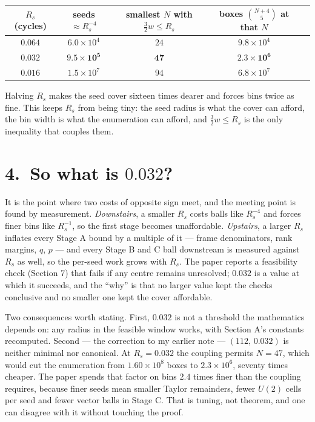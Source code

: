 \documentclass[11pt]{article}
\begin{document}
\begin{center}
\begin{tabular}{@{}ccccc@{}}
\toprule
$R_s$ (cycles) & seeds $\approx R_s^{-4}$ & smallest $N$ with $\tfrac32w\le R_s$ & boxes $\binom{N+4}{5}$ at that $N$\\
\midrule
$0.064$ & $6.0\times10^{4}$ & $24$ & $9.8\times10^{4}$\\
$\mathbf{0.032}$ & $\mathbf{9.5\times10^{5}}$ & $\mathbf{47}$ & $\mathbf{2.3\times10^{6}}$\\
$0.016$ & $1.5\times10^{7}$ & $94$ & $6.8\times10^{7}$\\
\bottomrule
\end{tabular}
\end{center}

\noindent
Halving $R_s$ makes the seed cover sixteen times dearer and forces bins twice as fine. This keeps $R_s$
from being tiny: the seed radius is what the cover can afford, the bin width is what the enumeration
can afford, and $\tfrac32w\le R_s$ is the only inequality that couples them.

\section*{4.\ So what is $0.032$?}

It is the point where two costs of opposite sign meet, and the meeting point is found by measurement.
\emph{Downstairs}, a smaller $R_s$ costs balls like $R_s^{-4}$ and forces finer bins like $R_s^{-1}$,
so the first stage becomes unaffordable. \emph{Upstairs}, a larger $R_s$ inflates every Stage A
bound by a multiple of it --- frame denominators, rank margins, $q$, $p$ --- and every Stage B and C
ball downstream is measured against $R_s$ as well, so the per-seed work grows with $R_s$. The paper
reports a feasibility check (Section 7) that fails if any centre remains unresolved; $0.032$ is a
value at which it succeeds, and the ``why'' is that no larger value kept the checks conclusive and no
smaller one kept the cover affordable.

Two consequences worth stating. First, $0.032$ is not a threshold the mathematics depends on: any
radius in the feasible window works, with Section A's constants recomputed. Second --- the correction
to my earlier note --- $(112,\,0.032)$ is neither minimal nor canonical. At $R_s=0.032$ the coupling
permits $N=47$, which would cut the enumeration from $1.60\times10^{8}$ boxes to $2.3\times10^{6}$,
seventy times cheaper. The paper spends that factor on bins $2.4$ times finer than the coupling
requires, because finer seeds mean smaller Taylor remainders, fewer $U(2)$ cells per seed and fewer
vector balls in Stage C. That is tuning, not theorem, and one can disagree with it without touching the
proof.
\end{document}
